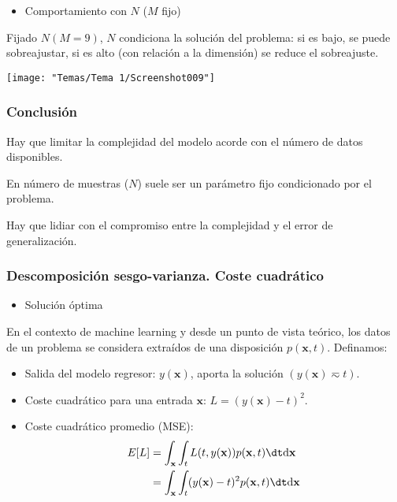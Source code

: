 \begin{minipage}{0.4\textwidth}
	\begin{itemize}[label=\color{red}\textbullet, leftmargin=*]
		\item \color{lightblue}Comportamiento con $N$ ($M$ fijo)
	\end{itemize}
	Fijado $N(M=9)$, $N$ condiciona la solución del problema: si es bajo, se puede sobreajustar, si es alto (con relación a la dimensión) se reduce el sobreajuste.
\end{minipage}\qquad\begin{minipage}{0.4\textwidth}
\begin{center}
	\texttt{[image: "Temas/Tema 1/Screenshot009"]}
\end{center}
\end{minipage}
\subsubsection{Conclusión}
Hay que limitar la complejidad del modelo acorde con el número de datos disponibles.

En número de muestras ($N$) suele ser un parámetro fijo condicionado por el problema.

Hay que lidiar con el compromiso entre la complejidad y el error de generalización.

\subsubsection{Descomposición sesgo-varianza. Coste cuadrático}
\begin{itemize}[label=\color{red}\textbullet, leftmargin=*]
	\item \color{lightblue}Solución óptima
\end{itemize}
En el contexto de machine learning y desde un punto de vista teórico, los datos de un problema se considera extraídos de una disposición $p(\mathbf{x},t)$. Definamos: 
\begin{itemize}
	\item Salida del modelo regresor: $y(\mathbf{x})$, aporta la solución $(y(\mathbf{x})\eqsim t)$.
	\item Coste cuadrático para una entrada $\mathbf{x}$: $L=(y(\mathbf{x})-t)^2$.
	\item Coste cuadrático promedio (MSE): \begin{align}
		E[L]&=\int_\mathbf{x}\int_t L(t,y(\mathbf{x}))p(\mathbf{x},t)\dt\mathrm{d}\mathbf{x}\\
		&=\int_\mathbf{x}\int_t(y(\mathbf{x})-t)^2p(\mathbf{x},t)\dt\mathrm{d}\mathbf{x}
	\end{align}
\end{itemize}

